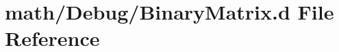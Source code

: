 \hypertarget{_binary_matrix_8d}{\section{math/\+Debug/\+Binary\+Matrix.d File Reference}
\label{_binary_matrix_8d}
}
